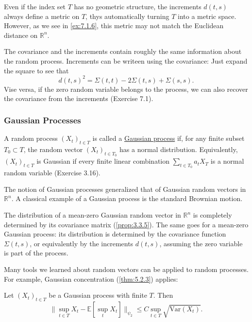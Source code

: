 \begin{remark}
\label{rmk:7.1.7}
Even if the index set $T$ has no geometric structure, the increments $d(t, s)$ always define a metric on $T$, 
thys automatically turning $T$ into a metric space. However, as we see in \cref{ex:7.1.6}, this metric may not 
match the Euclidean distance on $\mathbb{R}^n$.
\end{remark}

\begin{remark}
\label{rmk:7.1.8}
The covariance and the increments contain roughly the same information about the random process. Increments can 
be writeen using the covariance: Just expand the square to see that 
\[ d(t, s)^2 = \Sigma(t, t) - 2 \Sigma(t, s) + \Sigma(s, s). \]
Vise versa, if the zero random variable belongs to the process, we can also recover the covariance from the 
increments (Exercise 7.1).
\end{remark}


\subsubsection{Gaussian Processes}
\begin{definition}[]
\label{def:7.1.9}
A random process $(X_t)_{t \in T}$ is called a \underline{Gaussian process} if, for any finite subset 
$T_0 \subset T$, the random vector $(X_t)_{t \in T_0}$ has a normal distribution. Equivalently, 
$(X_t)_{t \in T}$ is Gaussian if every finite linear combination $\sum_{t \in T_0}^{}a_tX_T$ is a normal random 
variable (Exercise 3.16).
\end{definition}

The notion of Gaussian processes generalized that of Gaussian random vectors in $\mathbb{R}^n$. A classical 
example of a Gaussian process is the standard Brownian motion.

\begin{remark}
\label{rmk:7.1.10}
The distribution of a mean-zero Gaussian random vector in $\mathbb{R}^n$ is completely determined by its 
covariance matrix (\cref{prop:3.3.5}). The same goes for a mean-zero Gaussian process: its distribution is 
determined by the covariance function $\Sigma(t, s)$, or equivalently by the increments $d(t, s)$, assuming the 
zero variable is part of the process.
\end{remark}

Many tools we learned about random vectors can be applied to random processes. For example, Gaussian 
concentration (\cref{thm:5.2.3}) applies: 
\begin{theorem}
\label{thm:7.1.11}
Let $(X_t)_{t \in T}$ be a Gaussian process with finite $T$. Then 
\[ \lVert \sup_{t \in T} X_t - \mathbb{E}\left[ \sup_t X_t \right] \rVert_{\psi_2} 
\leq C \sup_{t \in T} \sqrt{\mathrm{Var}(X_t)}. \]
\end{theorem}


